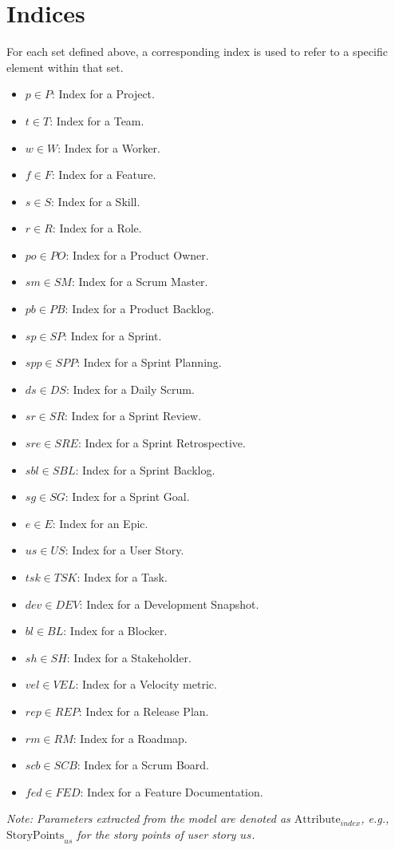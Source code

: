\documentclass[11pt]{article}
\begin{document}
\section{Indices}
For each set defined above, a corresponding index is used to refer to a specific element within that set.

\begin{itemize}
    \item $p \in P$: Index for a Project.
    \item $t \in T$: Index for a Team.
    \item $w \in W$: Index for a Worker.
    \item $f \in F$: Index for a Feature.
    \item $s \in S$: Index for a Skill.
    \item $r \in R$: Index for a Role.
    \item $po \in PO$: Index for a Product Owner.
    \item $sm \in SM$: Index for a Scrum Master.
    \item $pb \in PB$: Index for a Product Backlog.
    \item $sp \in SP$: Index for a Sprint.
    \item $spp \in SPP$: Index for a Sprint Planning.
    \item $ds \in DS$: Index for a Daily Scrum.
    \item $sr \in SR$: Index for a Sprint Review.
    \item $sre \in SRE$: Index for a Sprint Retrospective.
    \item $sbl \in SBL$: Index for a Sprint Backlog.
    \item $sg \in SG$: Index for a Sprint Goal.
    \item $e \in E$: Index for an Epic.
    \item $us \in US$: Index for a User Story.
    \item $tsk \in TSK$: Index for a Task.
    \item $dev \in DEV$: Index for a Development Snapshot.
    \item $bl \in BL$: Index for a Blocker.
    \item $sh \in SH$: Index for a Stakeholder.
    \item $vel \in VEL$: Index for a Velocity metric.
    \item $rep \in REP$: Index for a Release Plan.
    \item $rm \in RM$: Index for a Roadmap.
    \item $scb \in SCB$: Index for a Scrum Board.
    \item $fed \in FED$: Index for a Feature Documentation.
\end{itemize}
\textit{Note: Parameters extracted from the model are denoted as $\text{Attribute}_{index}$, e.g., $\text{StoryPoints}_{us}$ for the story points of user story $us$.}
\end{document}
